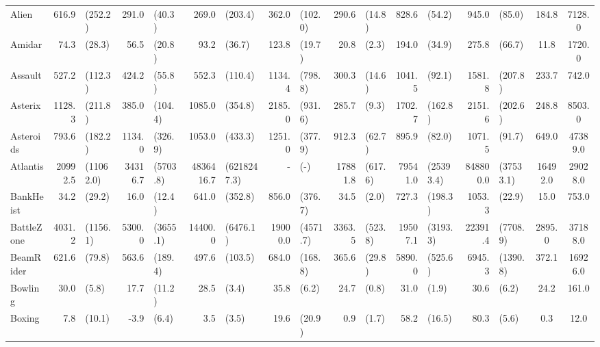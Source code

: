 \begin{landscape}
\begin{changemargin}{0cm}{0cm}
\begin{center}
\begin{table}[!htbp]
\begin{tabular}{l|rl|rl|rl|rl|rl|rl|rl|c|c}
\midrule
Alien          &    616.9 &    (252.2) &    291.0 &    (40.3) &      269.0 &      (203.4) &    362.0 &    (102.0) &    290.6 &   (14.8) &    828.6 &     (54.2) &     945.0 &     (85.0) &    184.8 &   7128.0 \\
Amidar         &     74.3 &     (28.3) &     56.5 &    (20.8) &       93.2 &       (36.7) &    123.8 &     (19.7) &     20.8 &    (2.3) &    194.0 &     (34.9) &     275.8 &     (66.7) &     11.8 &   1720.0 \\
Assault        &    527.2 &    (112.3) &    424.2 &    (55.8) &      552.3 &      (110.4) &   1134.4 &    (798.8) &    300.3 &   (14.6) &   1041.5 &     (92.1) &    1581.8 &    (207.8) &    233.7 &    742.0 \\
Asterix        &   1128.3 &    (211.8) &    385.0 &   (104.4) &     1085.0 &      (354.8) &   2185.0 &    (931.6) &    285.7 &    (9.3) &   1702.7 &    (162.8) &    2151.6 &    (202.6) &    248.8 &   8503.0 \\
Asteroids      &    793.6 &    (182.2) &   1134.0 &   (326.9) &     1053.0 &      (433.3) &   1251.0 &    (377.9) &    912.3 &   (62.7) &    895.9 &     (82.0) &    1071.5 &     (91.7) &    649.0 &  47389.0 \\
Atlantis       &  20992.5 &  (11062.0) &  34316.7 &  (5703.8) &  4836416.7 &  (6218247.3) &      - &      (-) &  17881.8 &  (617.6) &  79541.0 &  (25393.4) &  848800.0 &  (37533.1) &  16492.0 &  29028.0 \\
BankHeist      &     34.2 &     (29.2) &     16.0 &    (12.4) &      641.0 &      (352.8) &    856.0 &    (376.7) &     34.5 &    (2.0) &    727.3 &    (198.3) &    1053.3 &     (22.9) &     15.0 &    753.0 \\
BattleZone     &   4031.2 &   (1156.1) &   5300.0 &  (3655.1) &    14400.0 &     (6476.1) &  19000.0 &   (4571.7) &   3363.5 &  (523.8) &  19507.1 &   (3193.3) &   22391.4 &   (7708.9) &   2895.0 &  37188.0 \\
BeamRider      &    621.6 &     (79.8) &    563.6 &   (189.4) &      497.6 &      (103.5) &    684.0 &    (168.8) &    365.6 &   (29.8) &   5890.0 &    (525.6) &    6945.3 &   (1390.8) &    372.1 &  16926.0 \\
Bowling        &     30.0 &      (5.8) &     17.7 &    (11.2) &       28.5 &        (3.4) &     35.8 &      (6.2) &     24.7 &    (0.8) &     31.0 &      (1.9) &      30.6 &      (6.2) &     24.2 &    161.0 \\
Boxing         &      7.8 &     (10.1) &     -3.9 &     (6.4) &        3.5 &        (3.5) &     19.6 &     (20.9) &      0.9 &    (1.7) &     58.2 &     (16.5) &      80.3 &      (5.6) &      0.3 &     12.0 \\

\end{tabular}
\end{table}
\end{center}
\end{changemargin}
\end{landscape}
